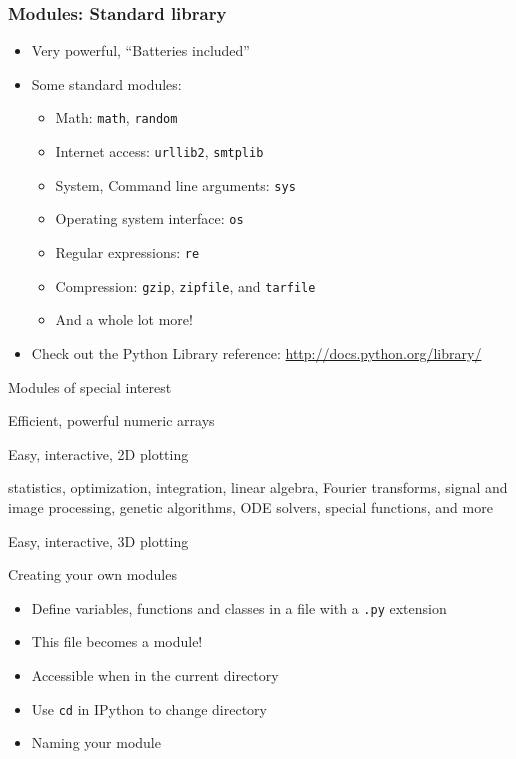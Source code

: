 \documentclass[14pt,compress]{beamer}
\newcommand{\typ}[1]{\texttt{#1}}
\begin{document}
\begin{frame}
  \frametitle{Modules: Standard library}
  \begin{itemize}
  \item Very powerful, ``Batteries included''
  \item Some standard modules:
    \begin{itemize}
    \item Math: \typ{math}, \typ{random}
    \item Internet access: \typ{urllib2}, \typ{smtplib}
    \item System, Command line arguments: \typ{sys}
    \item Operating system interface: \typ{os}
    \item Regular expressions: \typ{re}
    \item Compression: \typ{gzip}, \typ{zipfile}, and \typ{tarfile}
    \item And a whole lot more!
    \end{itemize}
  \item Check out the Python Library reference:
    \url{http://docs.python.org/library/}
  \end{itemize}
\end{frame}

\begin{frame}[fragile]
    {Modules of special interest}
    \begin{description}[matplotlibfor2d]

        \item[\typ{numpy}] Efficient, powerful numeric arrays

        \item[\typ{matplotlib}] Easy, interactive, 2D plotting

        \item[\typ{scipy}] statistics, optimization, integration, linear
            algebra, Fourier transforms, signal and image processing,
            genetic algorithms, ODE solvers, special functions, and more

        \item[Mayavi] Easy, interactive, 3D plotting

    \end{description}
\end{frame}

\begin{frame}[fragile]
    {Creating your own modules}
  \begin{itemize}
  \item Define variables, functions and classes in a file with a
    \typ{.py} extension
  \item This file becomes a module!
  \item Accessible when in the current directory
  \item Use \typ{cd} in IPython to change directory

  \item Naming your module
      \end{itemize}
\end{frame}
\end{document}
